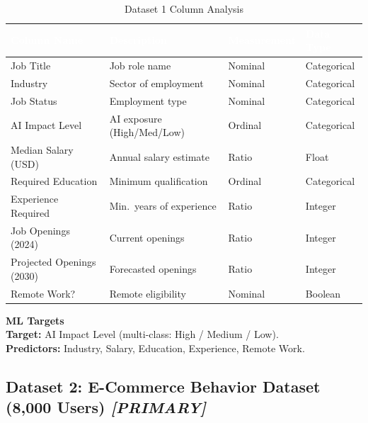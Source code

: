 \documentclass[11pt,a4paper]{article}
\begin{document}
\vspace{0.3cm}
\begin{table}[H]
\centering
\caption{Dataset 1 Column Analysis}
\small
\begin{tabular}{L{3.5cm} L{5cm} L{2cm} L{2cm}}
\toprule
{}
\textcolor{white}{\textbf{Column Name}} &
\textcolor{white}{\textbf{Description}} &
\textcolor{white}{\textbf{Measurement}} &
\textcolor{white}{\textbf{Data Type}} \\
\midrule
Job Title              & Job role name                  & Nominal & Categorical \\
Industry               & Sector of employment           & Nominal & Categorical \\
Job Status             & Employment type                & Nominal & Categorical \\
AI Impact Level        & AI exposure (High/Med/Low)     & Ordinal & Categorical \\
Median Salary (USD)    & Annual salary estimate         & Ratio   & Float \\
Required Education     & Minimum qualification          & Ordinal & Categorical \\
Experience Required    & Min.\ years of experience      & Ratio   & Integer \\
Job Openings (2024)    & Current openings               & Ratio   & Integer \\
Projected Openings (2030) & Forecasted openings         & Ratio   & Integer \\
Remote Work?           & Remote eligibility             & Nominal & Boolean \\
\bottomrule
\end{tabular}
\end{table}

\begin{mlbox}
\textbf{\color{black} ML Targets}\\
\textbf{Target:} AI Impact Level (multi-class: High / Medium / Low).\\
\textbf{Predictors:} Industry, Salary, Education, Experience, Remote Work.
\end{mlbox}

\vspace{0.5cm}

\subsection{Dataset 2: E-Commerce Behavior Dataset (8,000 Users)
            \textnormal{\textit{[PRIMARY]}}}
\end{document}

